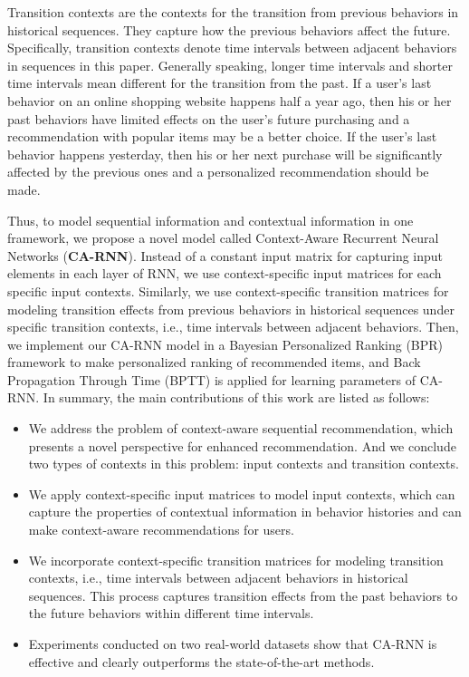 \documentclass{sig-alternate}
\begin{document}
Transition contexts are the contexts for the transition from previous behaviors in historical sequences. They capture how the previous behaviors affect the future. Specifically, transition contexts denote time intervals between adjacent behaviors in sequences in this paper. Generally speaking, longer time intervals and shorter time intervals mean different for the transition from the past. If a user's last behavior on an online shopping website happens half a year ago, then his or her past behaviors have limited effects on the user's future purchasing and a recommendation with popular items may be a better choice. If the user's last behavior happens yesterday, then his or her next purchase will be significantly affected by the previous ones and a personalized recommendation should be made.

Thus, to model sequential information and contextual information in one framework, we propose a novel model called Context-Aware Recurrent Neural Networks (\textbf{CA-RNN}). Instead of a constant input matrix for capturing input elements in each layer of RNN, we use context-specific input matrices for each specific input contexts. Similarly, we use context-specific transition matrices for modeling transition effects from previous behaviors in historical sequences under specific transition contexts, i.e., time intervals between adjacent behaviors. Then, we implement our CA-RNN model in a Bayesian Personalized Ranking (BPR) \cite{rendle2009bpr} framework to make personalized ranking of recommended items, and Back Propagation Through Time (BPTT) \cite{rumelhart1988learning} is applied for learning parameters of CA-RNN. In summary, the main contributions of this work are listed as follows:

\begin{itemize}
\item
We address the problem of context-aware sequential recommendation, which presents a novel perspective for enhanced recommendation. And we conclude two types of contexts in this problem: input contexts and transition contexts.

\item
We apply context-specific input matrices to model input contexts, which can capture the properties of contextual information in behavior histories and can make context-aware recommendations for users.

\item
We incorporate context-specific transition matrices for modeling transition contexts, i.e., time intervals between adjacent behaviors in historical sequences. This process captures transition effects from the past behaviors to the future behaviors within different time intervals.

\item
Experiments conducted on two real-world datasets show that CA-RNN is effective and clearly outperforms the state-of-the-art methods.

\end{itemize}
\end{document}

